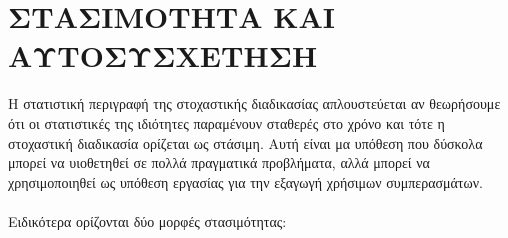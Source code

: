 \section{ ΣΤΑΣΙΜΟΤΗΤΑ ΚΑΙ ΑΥΤΟΣΥΣΧΕΤΗΣΗ}
Η στατιστική περιγραφή της στοχαστικής διαδικασίας απλουστεύεται αν
θεωρήσουμε ότι οι στατιστικές της ιδιότητες παραμένουν σταθερές στο χρόνο και
τότε η στοχαστική διαδικασία ορίζεται ως στάσιμη. Αυτή είναι μα υπόθεση που
δύσκολα μπορεί να υιοθετηθεί σε πολλά πραγματικά προβλήματα, αλλά μπορεί να
χρησιμοποιηθεί ως υπόθεση εργασίας για την εξαγωγή χρήσιμων συμπερασμάτων.\\ \\
Ειδικότερα ορίζονται δύο μορφές στασιμότητας:\\



